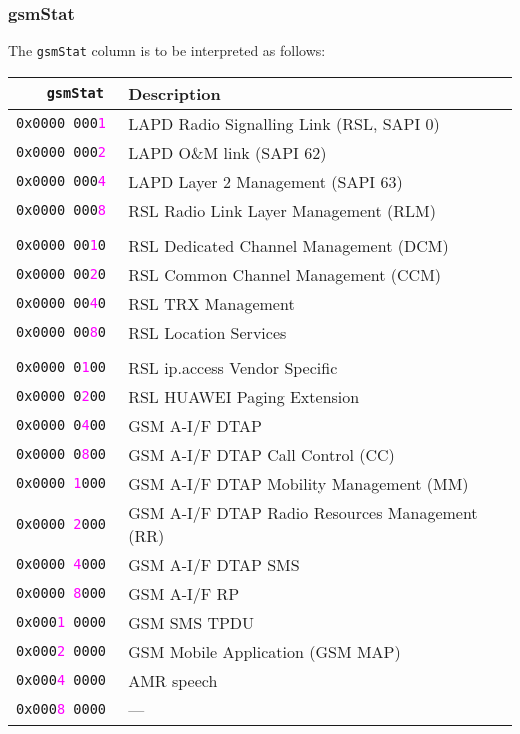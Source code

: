 \documentclass[documentation]{subfiles}
\begin{document}
\subsubsection{gsmStat}\label{gsmStat}
The {\tt gsmStat} column is to be interpreted as follows:
\begin{longtable}{>{\tt}rl}
    \toprule
    {\bf gsmStat} & {\bf Description}\\
    \midrule\endhead%
    0x0000 000\textcolor{magenta}{1} & LAPD Radio Signalling Link (RSL, SAPI 0)\\
    0x0000 000\textcolor{magenta}{2} & LAPD O\&M link (SAPI 62)\\
    0x0000 000\textcolor{magenta}{4} & LAPD Layer 2 Management (SAPI 63)\\
    0x0000 000\textcolor{magenta}{8} & RSL Radio Link Layer Management (RLM)\\
    \\
    0x0000 00\textcolor{magenta}{1}0 & RSL Dedicated Channel Management (DCM)\\
    0x0000 00\textcolor{magenta}{2}0 & RSL Common Channel Management (CCM)\\
    0x0000 00\textcolor{magenta}{4}0 & RSL TRX Management\\
    0x0000 00\textcolor{magenta}{8}0 & RSL Location Services\\
    \\
    0x0000 0\textcolor{magenta}{1}00 & RSL ip.access Vendor Specific\\
    0x0000 0\textcolor{magenta}{2}00 & RSL HUAWEI Paging Extension\\
    0x0000 0\textcolor{magenta}{4}00 & GSM A-I/F DTAP\\
    0x0000 0\textcolor{magenta}{8}00 & GSM A-I/F DTAP Call Control (CC)\\

    0x0000 \textcolor{magenta}{1}000 & GSM A-I/F DTAP Mobility Management (MM)\\
    0x0000 \textcolor{magenta}{2}000 & GSM A-I/F DTAP Radio Resources Management (RR)\\
    0x0000 \textcolor{magenta}{4}000 & GSM A-I/F DTAP SMS\\
    0x0000 \textcolor{magenta}{8}000 & GSM A-I/F RP\\

    0x000\textcolor{magenta}{1} 0000 & GSM SMS TPDU\\
    0x000\textcolor{magenta}{2} 0000 & GSM Mobile Application (GSM MAP)\\
    0x000\textcolor{magenta}{4} 0000 & AMR speech\\
    0x000\textcolor{magenta}{8} 0000 & ---\\


\end{longtable}
\end{document}
